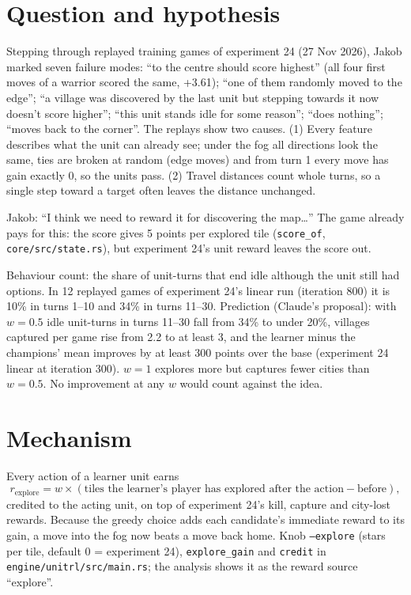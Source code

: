 \documentclass{../polyexp}
\begin{document}

\ExpHeader

\section{Question and hypothesis}
Stepping through replayed training games of experiment 24 (27 Nov 2026), Jakob marked seven failure modes:
``to the centre should score highest'' (all four first moves of a warrior scored the same, +3.61);
``one of them randomly moved to the edge'';
``a village was discovered by the last unit but stepping towards it now doesn't score higher'';
``this unit stands idle for some reason''; ``does nothing''; ``moves back to the corner''.
The replays show two causes. (1) Every feature describes what the unit can already see; under the fog all directions
look the same, ties are broken at random (edge moves) and from turn 1 every move has gain exactly 0, so the units pass.
(2) Travel distances count whole turns, so a single step toward a target often leaves the distance unchanged.

Jakob: ``I think we need to reward it for discovering the map\ldots'' The game already pays for this: the score gives
5 points per explored tile (\texttt{score\_of}, \texttt{core/src/state.rs}), but experiment 24's unit reward leaves the
score out.

Behaviour count: the share of unit-turns that end idle although the unit still had options. In 12 replayed games of
experiment 24's linear run (iteration 800) it is 10\% in turns 1--10 and 34\% in turns 11--30.
Prediction (Claude's proposal): with $w = 0.5$ idle unit-turns in turns 11--30 fall from 34\% to under 20\%, villages
captured per game rise from 2.2 to at least 3, and the learner minus the champions'
mean improves by at least 300 points over the base (experiment 24 linear at iteration 300). $w = 1$ explores more but
captures fewer cities than $w = 0.5$. No improvement at any $w$ would count against the idea.

\section{Mechanism}
Every action of a learner unit earns
\[ r_{\text{explore}} = w \times (\text{tiles the learner's player has explored after the action} - \text{before}), \]
credited to the acting unit, on top of experiment 24's kill, capture and city-lost rewards. Because the greedy choice
adds each candidate's immediate reward to its gain, a move into the fog now beats a move back home. Knob
\texttt{--explore} (stars per tile, default 0 = experiment 24), \texttt{explore\_gain} and \texttt{credit} in
\texttt{engine/unitrl/src/main.rs}; the analysis shows it as the reward source ``explore''.
\end{document}
